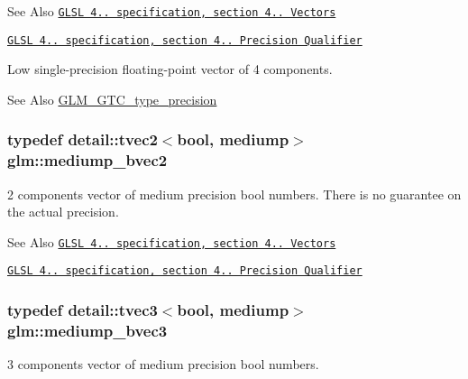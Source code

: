 \begin{DoxySeeAlso}{See Also}
\href{http://www.opengl.org/registry/doc/GLSLangSpec.4.20.8.pdf}{\tt G\-L\-S\-L 4.. specification, section 4.. Vectors} 

\href{http://www.opengl.org/registry/doc/GLSLangSpec.4.20.8.pdf}{\tt G\-L\-S\-L 4.. specification, section 4.. Precision Qualifier}
\end{DoxySeeAlso}
Low single-\/precision floating-\/point vector of 4 components. \begin{DoxySeeAlso}{See Also}
\hyperlink{group__gtc__type__precision}{G\-L\-M\-\_\-\-G\-T\-C\-\_\-type\-\_\-precision} 
\end{DoxySeeAlso}
\hypertarget{group__core__precision_ga1406d96eb96694d91052d3f882658ab2}{
\subsubsection[{mediump\-\_\-bvec2}]{\setlength{\rightskip}{0pt plus 5cm}typedef detail\-::tvec2$<$bool, mediump$>$ {\bf glm\-::mediump\-\_\-bvec2}}}\label{group__core__precision_ga1406d96eb96694d91052d3f882658ab2}
2 components vector of medium precision bool numbers. There is no guarantee on the actual precision.

\begin{DoxySeeAlso}{See Also}
\href{http://www.opengl.org/registry/doc/GLSLangSpec.4.20.8.pdf}{\tt G\-L\-S\-L 4.. specification, section 4.. Vectors} 

\href{http://www.opengl.org/registry/doc/GLSLangSpec.4.20.8.pdf}{\tt G\-L\-S\-L 4.. specification, section 4.. Precision Qualifier} 
\end{DoxySeeAlso}
\hypertarget{group__core__precision_gae7c8d0136e829d6fe3feb00856e35f11}{
\subsubsection[{mediump\-\_\-bvec3}]{\setlength{\rightskip}{0pt plus 5cm}typedef detail\-::tvec3$<$bool, mediump$>$ {\bf glm\-::mediump\-\_\-bvec3}}}\label{group__core__precision_gae7c8d0136e829d6fe3feb00856e35f11}
3 components vector of medium precision bool numbers.

